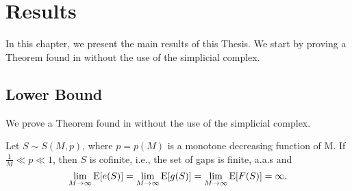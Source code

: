 \chapter{Results}\label{chap:results}

In this chapter, we present the main results of this Thesis. We start by proving a Theorem found in \cite{de2018random} without the use of the simplicial complex. 

\section{Lower Bound}\label{sec:results:lowerbound}

We prove a Theorem found in \cite{de2018random} without the use of the simplicial complex. 

\begin{theorem}
    Let $S \sim S(M, p)$, where $p = p(M)$ is a monotone decreasing function of M. If $\frac{1}{M} \ll p \ll 1$, then $S$ is cofinite, i.e., the set of gaps is finite, a.a.s and 
\[\lim_{M \to \infty} \mathrm{E}[e(S)] = \lim_{M \to \infty} \mathrm{E}[g(S)] = \lim_{M \to \infty} \mathrm{E}[F(S)] = \infty.\]
\end{theorem}

